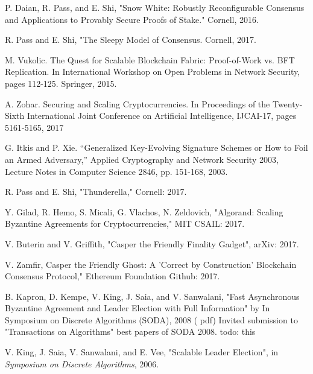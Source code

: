 \documentclass[10pt,journal,compsoc]{IEEEtran}
\begin{document}
\begin{thebibliography}{1}
 P. Daian, R. Pass, and E. Shi, "Snow White: Robustly Reconfigurable Consensus and Applications to Provably Secure Proofs of Stake." Cornell, 2016.

 R. Pass and E. Shi, "The Sleepy Model of Consensus. Cornell, 2017.

 M. Vukolic. The Quest for Scalable Blockchain Fabric: Proof-of-Work vs. BFT Replication. In International Workshop on Open Problems in Network Security, pages 112-125. Springer, 2015.

 A. Zohar. Securing and Scaling Cryptocurrencies. In Proceedings of the Twenty-Sixth International Joint Conference on Artificial Intelligence, IJCAI-17, pages 5161-5165, 2017

 G. Itkis and P. Xie. “Generalized Key-Evolving Signature Schemes or How to Foil an Armed Adversary,” Applied Cryptography and Network Security 2003, Lecture Notes in Computer Science 2846, pp. 151-168, 2003.

 R. Pass and E. Shi, "Thunderella," Cornell: 2017.

Y. Gilad, R. Hemo, S. Micali, G. Vlachos, N. Zeldovich, "Algorand: Scaling Byzantine Agreements for Cryptocurrencies," MIT CSAIL: 2017.

V. Buterin and V. Griffith, "Casper the Friendly Finality Gadget", arXiv: 2017.

 V. Zamfir, Casper the Friendly Ghost: A 'Correct by Construction' Blockchain Consensus Protocol," Ethereum Foundation Github: 2017.

B. Kapron, D. Kempe, V. King, J. Saia, and V. Sanwalani, "Fast Asynchronous Byzantine Agreement and Leader Election with Full Information" by In Symposium on Discrete Algorithms (SODA), 2008 ( pdf) Invited submission to "Transactions on Algorithms" best papers of SODA 2008. todo: this

V. King, J. Saia, V. Sanwalani, and E. Vee, "Scalable Leader Election", in \emph{Symposium on Discrete Algorithms}, 2006.

\end{thebibliography}

% 
\end{document}
